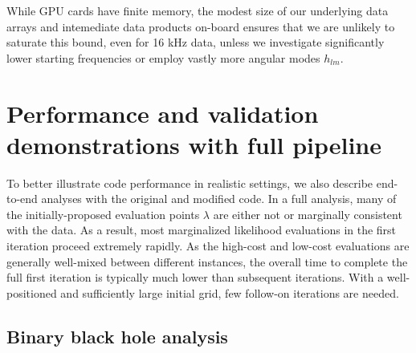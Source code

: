 \documentclass[twocolumn,prd,nofootinbib]{revtex4}
\newcommand\editremark[1]{{\color{red} #1}}
\begin{document}
While GPU cards have finite memory, the modest size of our underlying data arrays and intemediate data products on-board ensures that we are unlikely to
saturate this bound, even for 16 kHz data, unless we investigate significantly lower starting frequencies or
employ vastly more angular modes $h_{lm}$.

\section{Performance and validation demonstrations with full pipeline}
\label{sec:end-to-end}

To better illustrate code performance in realistic settings, we also describe end-to-end analyses with
the original and modified code.     In a full analysis, many of the initially-proposed  evaluation points $\lambda$ are
either not or marginally consistent with the data.  As a result, most marginalized likelihood evaluations in the first
iteration proceed extremely rapidly.  As the high-cost and low-cost evaluations are generally well-mixed between
different instances, the overall time to complete the full first iteration is typically much lower than subsequent
iterations.   With a well-positioned and sufficiently large initial grid,  few follow-on iterations are needed.  




\subsection{Binary black hole analysis}
\label{sec:sub:BBHFull}
\end{document}
